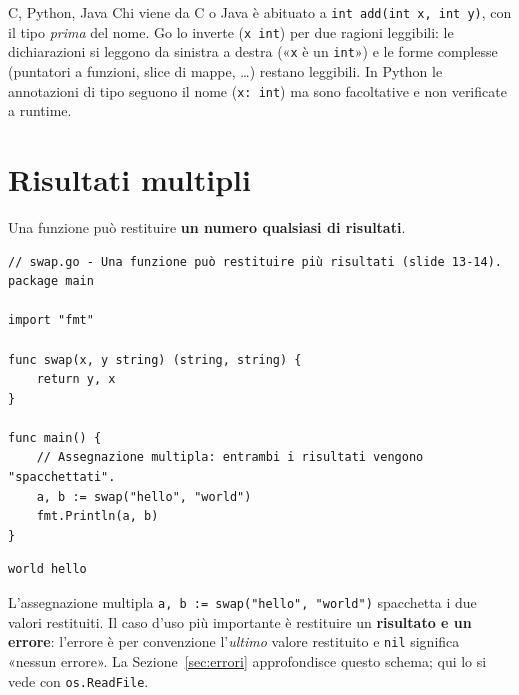 \documentclass[11pt,a4paper]{report}
\newcommand{\cod}[1]{\texttt{#1}}
\begin{document}
\begin{confronto}{C, Python, Java}
Chi viene da C o Java è abituato a \cod{int add(int x, int y)}, con il tipo
\emph{prima} del nome. Go lo inverte (\cod{x int}) per due ragioni leggibili:
le dichiarazioni si leggono da sinistra a destra («\cod{x} è un \cod{int}») e
le forme complesse (puntatori a funzioni, slice di mappe, \ldots) restano
leggibili. In Python le annotazioni di tipo seguono il nome (\cod{x: int}) ma sono
facoltative e non verificate a runtime.
\end{confronto}

\section{Risultati multipli}

Una funzione può restituire \textbf{un numero qualsiasi di risultati}.

\begin{lstlisting}[style=gocode,caption={\texttt{02\_functions/swap.go}}]
// swap.go - Una funzione può restituire più risultati (slide 13-14).
package main

import "fmt"

func swap(x, y string) (string, string) {
	return y, x
}

func main() {
	// Assegnazione multipla: entrambi i risultati vengono "spacchettati".
	a, b := swap("hello", "world")
	fmt.Println(a, b)
}
\end{lstlisting}
\begin{lstlisting}[style=output]
world hello
\end{lstlisting}

L'assegnazione multipla \cod{a, b := swap("hello", "world")} spacchetta i due
valori restituiti. Il caso d'uso più importante è restituire un
\textbf{risultato e un errore}: l'errore è per convenzione l'\emph{ultimo} valore
restituito e \cod{nil} significa «nessun errore». La Sezione~\ref{sec:errori}
approfondisce questo schema; qui lo si vede con \cod{os.ReadFile}.
\end{document}
